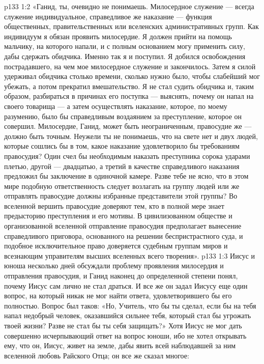 \vs p133 1:2 «Ганид, ты, очевидно не понимаешь. Милосердное служение --- всегда служение индивидуальное, справедливое же наказание --- функция общественных, правительственных или вселенских административных групп. Как индивидуум я обязан проявить милосердие. Я должен прийти на помощь мальчику, на которого напали, и с полным основанием могу применить силу, дабы сдержать обидчика. Именно так я и поступил. Я добился освобождения пострадавшего, на чем мое милосердное служение и закончилось. Затем я силой удерживал обидчика столько времени, сколько нужно было, чтобы слабейший мог убежать, а потом прекратил вмешательство. Я не стал судить обидчика и, таким образом, разбираться в причинах его поступка --- выяснять, почему он напал на своего товарища --- а затем осуществлять наказание, которое, по моему разумению, было бы справедливым воздаянием за преступление, которое он совершил. Милосердие, Ганид, может быть неограниченным, правосудие же --- должно быть точным. Неужели ты не понимаешь, что на свете нет и двух людей, которые сошлись бы в том, какое наказание удовлетворило бы требованиям правосудия? Один счел бы необходимым наказать преступника сорока ударами плетью, другой --- двадцатью, а третий в качестве справедливого наказания предложил бы заключение в одиночной камере. Разве тебе не ясно, что в этом мире подобную ответственность следует возлагать на группу людей или же отправлять правосудие должны избранные представители этой группы? Во вселенной вершить правосудие доверяют тем, кто в полной мере знает предысторию преступления и его мотивы. В цивилизованном обществе и организованной вселенной отправление правосудия предполагает вынесение справедливого приговора, основанного на решении беспристрастного суда, и подобное исключительное право доверяется судебным группам миров и всезнающим управителям высших вселенных всего творения».
\vs p133 1:3 Иисус и юноша несколько дней обсуждали проблему проявления милосердия и отправления правосудия, и Ганид наконец до определенной степени понял, почему Иисус сам лично не стал драться. И все же он задал Иисусу еще один вопрос, на который никак не мог найти ответа, удовлетворившего бы его полностью. Вопрос был таков: «Но, Учитель, что бы ты сделал, если бы на тебя напал недобрый человек, оказавшийся сильнее тебя, который стал бы угрожать твоей жизни? Разве не стал бы ты себя защищать?» Хотя Иисус не мог дать совершенно исчерпывающий ответ на вопрос юноши, ибо не хотел открывать ему, что он, Иисус, живет на земле, дабы явить всей наблюдавшей за ним вселенной любовь Райского Отца; он все же сказал многое:
